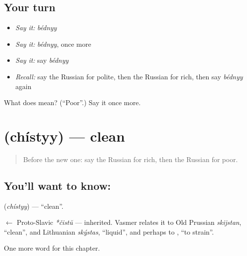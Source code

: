 \subsection*{Your turn}
\begin{itemize}
\raggedright
  \item \emph{Say it:} \emph{bédnyy}
  \item \emph{Say it:} \emph{bédnyy}, once more
  \item \emph{Say it:} say \emph{bédnyy}
  \item \emph{Recall:} say the Russian for polite, then the Russian for rich, then say \emph{bédnyy} again
\end{itemize}

\begin{tcolorbox}[breakable,colback=teal!4,colframe=teal!35!black,title={Before you move on}]
What does  mean? (\textquotedblleft{}Poor\textquotedblright{}.) Say it once more.
\end{tcolorbox}
\section[\texorpdfstring{\ru{чистый} (chístyy)}{чистый (chístyy)}]{ (chístyy) — clean}

\label{lesson:RU-C156-chistyy}



\begin{quote}
Before the new one: say the Russian for rich, then the Russian for poor.
\end{quote}

\subsection*{You'll want to know: }
\textbf{} (\emph{chístyy}) — \textquotedblleft{}clean\textquotedblright{}.

\begin{cousinweb}
\textbf{} $\leftarrow$ Proto-Slavic \emph{*čistŭ} — inherited. Vasmer relates it to Old Prussian \emph{skijstan}, \textquotedblleft{}clean\textquotedblright{}, and Lithuanian \emph{skýstas}, \textquotedblleft{}liquid\textquotedblright{}, and perhaps to \emph{}, \textquotedblleft{}to strain\textquotedblright{}.
\end{cousinweb}

\begin{grammarlens}[title={What you've built}]
One more word for this chapter.
\end{grammarlens}

